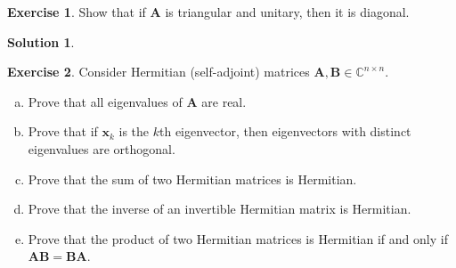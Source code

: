 \documentclass[12pt]{article}
\newcommand{\bbC}{\mathbb{C}}
\renewcommand{\vec}[1]{\mathbf{#1}}
\theoremstyle{definition}
\newtheorem{exer}{Exercise}
\newtheorem{sol}{Solution}
\theoremstyle{remark}
\begin{document}
\begin{exer}
    Show that if $\vec{A}$ is triangular and unitary, then it is diagonal.
\end{exer}

\begin{sol}
    
\end{sol}


\begin{exer}
    Consider Hermitian (self-adjoint) matrices $\vec{A}, \vec{B} \in \bbC^{n\times n}$.
    \begin{enumerate}[a.]
        \item Prove that all eigenvalues of $\vec{A}$ are real.
        \item Prove that if $\vec{x}_k$ is the $k$th eigenvector, then eigenvectors with distinct eigenvalues are orthogonal.
        \item Prove that the sum of two Hermitian matrices is Hermitian.
        \item Prove that the inverse of an invertible Hermitian matrix is Hermitian.
        \item Prove that the product of two Hermitian matrices is Hermitian if and only if $\vec{AB} = \vec{BA}$.
    \end{enumerate}
\end{exer}
\end{document}
